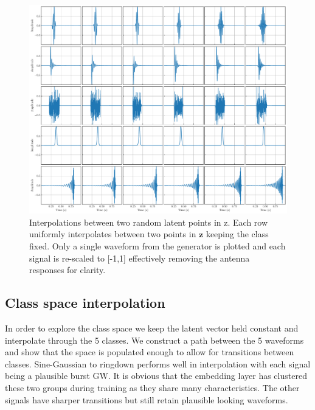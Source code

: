 \documentclass[12pt]{iopart}
\begin{document}
\begin{figure}[ht]
    \centering
    \includegraphics[width=\textwidth]{figures/z_interp_fix_c.pdf}
    \caption{Interpolations between two random latent points in z. Each row uniformly interpolates between two points in $\mathbf{z}$ keeping the class fixed. Only a single waveform from the generator is plotted and each signal is re-scaled to [-1,1] effectively removing the antenna responses for clarity.}
    \label{fig:z_interp}
\end{figure}

\subsection{Class space interpolation}
In order to explore the class space we keep the latent vector held constant and interpolate through the 5 classes. We construct a path between the 5 waveforms and show that the space is populated enough to allow for transitions between classes. Sine-Gaussian to ringdown performs well in interpolation with each signal being a plausible burst GW. It is obvious that the embedding layer has clustered these two groups during training as they share many characteristics. The other signals have sharper transitions but still retain plausible looking waveforms.  
\end{document}
